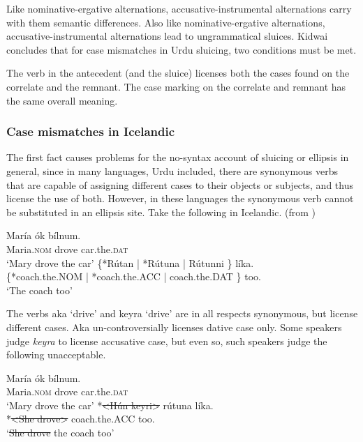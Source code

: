 \documentclass{turabian-researchpaper}
\begin{document}
Like nominative-ergative alternations, accusative-instrumental alternations carry with them semantic differences. Also like nominative-ergative alternations, accusative-instrumental alternations lead to ungrammatical sluices. Kidwai concludes that for case mismatches in Urdu sluicing, two conditions must be met. 

\begin{exe}
\ex\label{kidwaicond} 
\begin{xlist}
\ex The verb in the antecedent (and the sluice) licenses both the cases found on the correlate and the remnant. 
\ex The case marking on the correlate and remnant has the same overall meaning. 
\end{xlist}
\end{exe}

\subsubsection{Case mismatches in Icelandic} 
The first fact causes problems for the no-syntax account of sluicing or ellipsis in general, since in many languages, Urdu included, there are synonymous verbs that are capable of assigning different cases to their objects or subjects, and thus license the use of both. However, in these languages the synonymous verb cannot be substituted in an ellipsis site. Take the following in Icelandic. (from \citep*{woodetal2016}) 

\begin{exe}
\ex\label{mariadrove1}
\gll {} Mar\'ia \'ok b\'ilnum. \\
{} Maria.\textsc{nom} drove car.the.\textsc{dat} \\
\trans `Mary drove the car' 
\gll {}  \{*R\'utan | *R\'utuna | R\'utunni \} l\'ika. \\ 
{} \{*coach.the.NOM | *coach.the.ACC | coach.the.DAT \} too. \\
\trans `The coach too' 
\end{exe}

The verbs aka `drive' and keyra `drive' are in all respects synonymous, but license different cases. Aka un-controversially licenses dative case only. Some speakers judge \textit{keyra} to license accusative case, but even so, such speakers judge the following unacceptable.  

\begin{exe}
\ex\label{mariadrove2}
\gll {} Mar\'ia \'ok b\'ilnum. \\
{} Maria.\textsc{nom} drove car.the.\textsc{dat} \\
\trans `Mary drove the car' 
\gll {} *\sout{\textless H\'un keyr\dh i\textgreater} r\'utuna l\'ika. \\ 
{} *\sout{\textless She drove\textgreater} coach.the.ACC  too. \\
\trans `\sout{She drove} the coach too' 
\end{exe}
\end{document}
